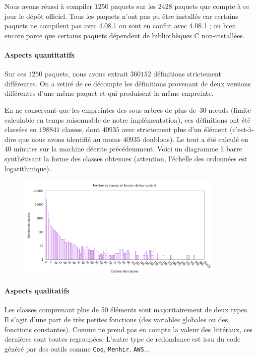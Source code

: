 Nous avons réussi à compiler $1250$ paquets sur les $2428$ paquets que
compte à ce jour le dépôt {\Opam} officiel. Tous les paquets n'ont pas
pu être installés car
certains paquets ne compilent pas avec {\OCaml} 4.08.1 ou
sont en conflit avec {\OCaml} 4.08.1 ; ou bien encore parce que
certains paquets dépendent de bibliothèques C non-installées.

\paragraph{Aspects quantitatifs}

Sur ces $1250$ paquets, nous avons extrait $360152$ définitions
strictement différentes. On a retiré de ce décompte les définitions
provenant de deux versions différentes d'une même paquet et qui
produisent la même empreinte.

En ne conservant que les empreintes des sous-arbres de plus de~$30$
nœuds (limite calculable en temps raisonnable de notre
implémentation), ces définitions ont été classées en $198841$ classes,
dont $40935$ avec strictement plus d'un élément (c'est-à-dire que nous
avons identifié au moins $40935$ doublons). Le tout a été calculé en
$40$ minutes sur la machine décrite précédemment. Voici un diagramme à
barre synthétisant la forme des classes obtenues (attention,
l'échelle des ordonnées est logarithmique).

\begin{figure}[h]
\begin{center}
\includegraphics[width=10cm]{figures/bars.png}
\end{center}
\end{figure}

\paragraph{Aspects qualitatifs}

Les classes comprenant plus de 50 éléments sont majoritairement de
deux types. Il s'agit d'une part de très petites fonctions (des
variables globales ou des fonctions constantes). Comme {\Asak} ne
prend pas en compte la valeur des littéraux, ces dernières sont toutes
regroupées. L'autre type de redondance est issu du code généré par des
outils comme \verb|Coq|, \verb|Menhir|, \verb|AWS|...

